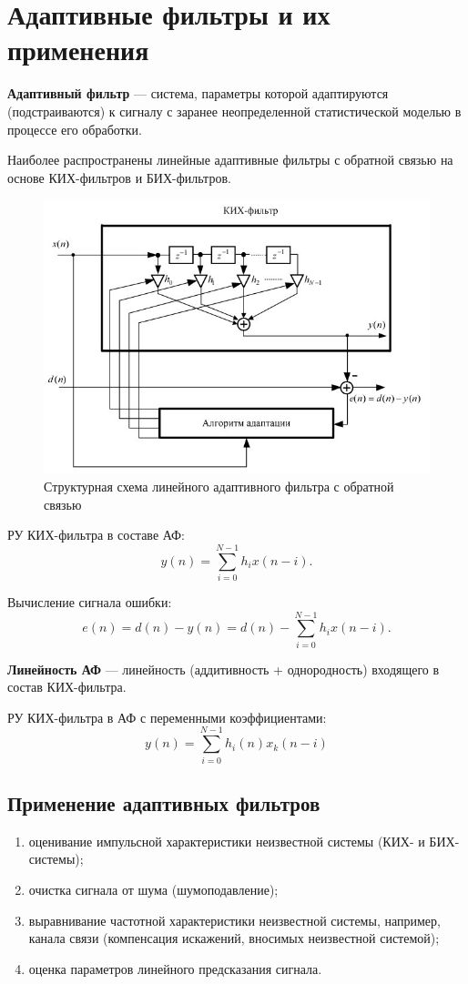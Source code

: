 \documentclass[a4paper, 14pt]{extarticle}
\begin{document}
\section{Адаптивные фильтры и их применения}
\textbf{Адаптивный фильтр} --- система, параметры которой адаптируются (подстраиваются) к сигналу с заранее неопределенной статистической моделью в процессе его обработки.

Наиболее распространены линейные адаптивные фильтры с обратной связью на основе КИХ-фильтров и БИХ-фильтров.

\begin{figure}[h]
    \centering
    \includegraphics[width=.7\textwidth]{img/S013.jpg}
    \caption{Структурная схема линейного адаптивного фильтра с обратной связью}%
\end{figure}

РУ КИХ-фильтра в составе АФ:
\begin{equation}
    y(n) = \sum^{N-1}_{i=0} h_i x(n-i).
\end{equation}

Вычисление сигнала ошибки:
\begin{equation}
    e(n) = d(n) - y(n) = d(n) - \sum^{N-1}_{i=0} h_i x(n-i).
\end{equation}

\textbf{Линейность АФ} --- линейность (аддитивность + однородность) входящего в состав КИХ-фильтра.

РУ КИХ-фильтра в АФ с переменными коэффициентами:
\begin{equation}
    y(n) = \sum^{N-1}_{i=0} h_i(n) x_k(n-i)
\end{equation}

\subsection{Применение адаптивных фильтров}
\begin{enumerate}
    \item оценивание импульсной характеристики неизвестной системы (КИХ- и БИХ-системы);
    \item очистка сигнала от шума (шумоподавление);
    \item выравнивание частотной характеристики неизвестной системы, например, канала связи (компенсация искажений,  вносимых неизвестной системой);
    \item оценка параметров линейного предсказания сигнала.
\end{enumerate}
\end{document}

